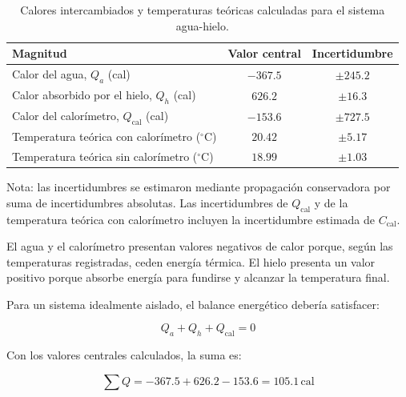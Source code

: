 \begin{table}[htbp] %
    \centering
    \caption{Calores intercambiados y temperaturas teóricas calculadas para el sistema agua-hielo.}
    \label{tab:resultados_calculados}
    \setlength{\tabcolsep}{4pt} 
    \begin{tabularx}{\columnwidth}{>{\RaggedRight\arraybackslash}Xcc}
        \toprule
        \textbf{Magnitud} & \textbf{Valor central} & \textbf{Incertidumbre} \\
        \midrule
        Calor del agua, $Q_a$ (cal) & $-367.5$ & $\pm245.2$ \\
        \addlinespace
        Calor absorbido por el hielo, $Q_h$ (cal) & $626.2$ & $\pm16.3$ \\
        \addlinespace
        Calor del calorímetro, $Q_{\mathrm{cal}}$ (cal) & $-153.6$ & $\pm727.5$ \\
        \addlinespace
        Temperatura teórica con calorímetro ($^\circ$C) & $20.42$ & $\pm5.17$ \\
        \addlinespace
        Temperatura teórica sin calorímetro ($^\circ$C) & $18.99$ & $\pm1.03$ \\
        \bottomrule
    \end{tabularx}

    \vspace{2mm}
    \footnotesize
    Nota: las incertidumbres se estimaron mediante propagación conservadora por suma de incertidumbres absolutas. Las incertidumbres de $Q_{\mathrm{cal}}$ y de la temperatura teórica con calorímetro incluyen la incertidumbre estimada de $C_{\mathrm{cal}}$.
\end{table}

El agua y el calorímetro presentan valores negativos de calor porque, según las temperaturas registradas, ceden energía térmica. El hielo presenta un valor positivo porque absorbe energía para fundirse y alcanzar la temperatura final.

Para un sistema idealmente aislado, el balance energético debería satisfacer:

\begin{equation}
    Q_a+Q_h+Q_{\mathrm{cal}}=0
    \label{eq:balance_agua_hielo}
\end{equation}

Con los valores centrales calculados, la suma es:

\begin{equation*}
    \sum Q=-367.5+626.2-153.6
    =105.1\,\mathrm{cal}
\end{equation*}


